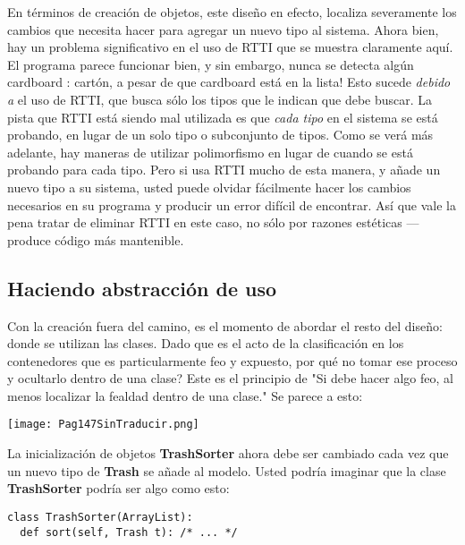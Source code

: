En términos de creación de objetos, este diseño en efecto, localiza severamente los cambios que necesita hacer para agregar un nuevo tipo al sistema. Ahora bien, hay un problema significativo en el uso de RTTI que se muestra claramente aquí. El programa parece funcionar bien, y sin embargo, nunca se detecta algún cardboard : cartón, a pesar de que cardboard está en la lista! Esto sucede \textit{debido a} el uso de RTTI, que busca sólo los tipos que le indican que debe buscar. La pista que RTTI está siendo mal utilizada es que \textit{cada tipo} en el sistema se está probando, en lugar de un solo tipo o subconjunto de tipos. Como se verá más adelante, hay maneras de utilizar polimorfismo en lugar de cuando se está probando para cada tipo. Pero si usa RTTI mucho de esta manera, y añade un nuevo tipo a su sistema, usted puede olvidar fácilmente  hacer los cambios necesarios en su programa y producir un error difícil de encontrar. Así que vale la pena tratar de eliminar RTTI en este caso, no sólo por razones estéticas — produce código más mantenible.      \newline



\subsection*{Haciendo abstracción de uso}
\label{subsec:hadu}


Con la creación fuera del camino, es el momento de abordar el resto del diseño: donde se utilizan las clases. Dado que es el acto de la clasificación en los contenedores que es particularmente feo y expuesto, por qué no tomar ese proceso y ocultarlo dentro de una clase? Este es el principio de "Si debe hacer algo feo, al menos localizar la fealdad dentro de una clase." Se parece a esto:   \newline

\texttt{[image: Pag147SinTraducir.png]}

La inicialización de objetos \textbf{TrashSorter} ahora debe ser cambiado cada vez que un nuevo tipo de \textbf{Trash} se añade al modelo. Usted podría imaginar que la clase \textbf{TrashSorter} podría ser algo como esto:     \newline

\begin{lstlisting} 
class TrashSorter(ArrayList): 
  def sort(self, Trash t): /* ... */  
\end{lstlisting}

